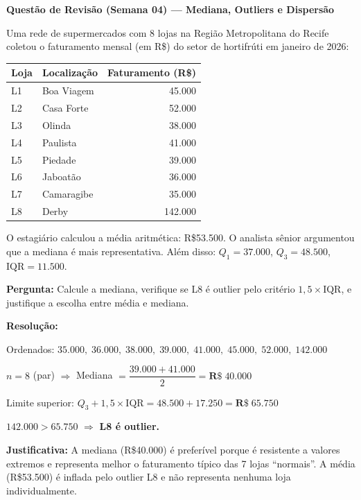 \begin{SolvedBox}
\textbf{Questão de Revisão (Semana 04) — Mediana, Outliers e Dispersão}

Uma rede de supermercados com 8 lojas na Região Metropolitana do Recife coletou
o faturamento mensal (em R\$) do setor de hortifrúti em janeiro de 2026:

\begin{center}
\begin{tabular}{|l|l|r|}
\hline
\textbf{Loja} & \textbf{Localização} & \textbf{Faturamento (R\$)} \\
\hline
L1 & Boa Viagem  & 45.000 \\
L2 & Casa Forte  & 52.000 \\
L3 & Olinda      & 38.000 \\
L4 & Paulista    & 41.000 \\
L5 & Piedade     & 39.000 \\
L6 & Jaboatão    & 36.000 \\
L7 & Camaragibe  & 35.000 \\
L8 & Derby       & 142.000 \\
\hline
\end{tabular}
\end{center}

O estagiário calculou a média aritmética: R\$53.500. O analista sênior argumentou
que a mediana é mais representativa. Além disso:
$Q_1 = 37.000$, $Q_3 = 48.500$, $\text{IQR} = 11.500$.

\textbf{Pergunta:} Calcule a mediana, verifique se L8 é outlier pelo critério
$1{,}5 \times \text{IQR}$, e justifique a escolha entre média e mediana.

\medskip
\textbf{Resolução:}

Ordenados: $35.000,\; 36.000,\; 38.000,\; 39.000,\; 41.000,\; 45.000,\; 52.000,\; 142.000$

$n = 8$ (par) $\Rightarrow$ Mediana $= \dfrac{39.000 + 41.000}{2} = \mathbf{R\$\;40.000}$

Limite superior: $Q_3 + 1{,}5 \times \text{IQR} = 48.500 + 17.250 = \mathbf{R\$\;65.750}$

$142.000 > 65.750$ $\Rightarrow$ \textbf{L8 é outlier.}

\textbf{Justificativa:} A mediana (R\$40.000) é preferível porque é resistente a
valores extremos e representa melhor o faturamento típico das 7 lojas ``normais''.
A média (R\$53.500) é inflada pelo outlier L8 e não representa nenhuma loja
individualmente.
\end{SolvedBox}

